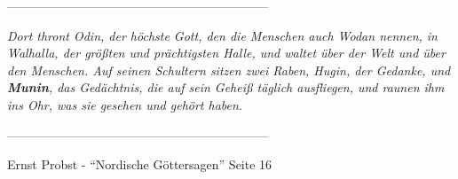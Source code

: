 \vfill

\begin{center}
---------------------------------------------------------------
\end{center}


\textsl{Dort thront Odin, der höchste Gott, den die Menschen auch Wodan nennen, in Walhalla, der größten und prächtigsten Halle, und waltet über der Welt und über den Menschen. Auf seinen Schultern sitzen zwei Raben, Hugin, der Gedanke, und \textbf{Munin}, das Gedächtnis, die auf sein Geheiß täglich ausfliegen, und raunen ihm ins Ohr, was sie gesehen und gehört haben.}

\begin{center}
---------------------------------------------------------------
\end{center}

\begin{flushright}
Ernst Probst - "`Nordische Göttersagen"' \cite{Pro02} Seite 16 
\end{flushright}

\thispagestyle{empty}
\newpage

\makeatother 